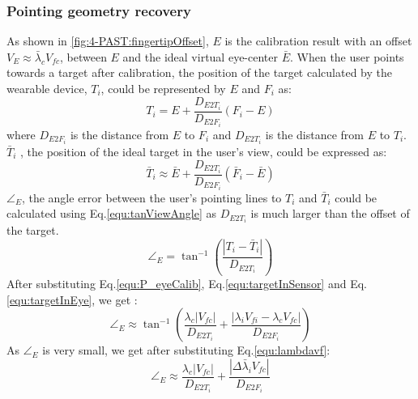 \subsubsection{Pointing geometry recovery} \label{sec:4-PAST:PASTrecovery}
As shown in \figurename{ \ref{fig:4-PAST:fingertipOffset}}, $E$ is the calibration result with an offset $V_{E} \approx \bar\lambda_c V_{fc}$, between $E$ and the ideal virtual eye-center ${\bar E}$. 
When the user points towards a target after calibration, the position of the target calculated by the wearable device, $T_i$, could be represented by $E$ and $F_i$ as:
\begin{equation} \label{equ:targetInSensor}
T_i = E+ \frac{D_{E2T_i}}{D_{E2F_i}}  \left( {F_i - E} \right)
\end{equation}
where $D_{E2F_i}$ is the distance from $E$ to ${{F_i}}$ and $D_{E2T_i}$ is the distance from ${E}$ to ${T_i}$. \\
$\bar T_i$ , the position of the ideal target in the user's view, could be expressed as:
\begin{equation} \label{equ:targetInEye}
\bar T_i \approx {\bar E} + \frac{D_{E2T_i}}{D_{E2F_i}}  \left( {{\bar F_i} - {\bar E}} \right)
\end{equation}
${\angle}_{E}$, the angle error between the user's pointing lines to $T_i$ and $\bar T_i$ could be calculated using Eq.\ref{equ:tanViewAngle} as $D_{E2T_i}$ is much larger than the offset of the target. 
\begin{equation} \label{equ:tanViewAngle}
{\angle}_{E} = \tan^{-1} \left( {\frac{| {T_i - \bar T_i}| }{D_{E2T_i}} } \right)
\end{equation}
After substituting Eq.\ref{equ:P_eyeCalib}, Eq.\ref{equ:targetInSensor} and Eq.\ref{equ:targetInEye}, we get :
\begin{equation} \label{equ:tanViewAngle1}
{\angle}_{E} \approx \tan^{-1} \left( {{\frac{{\lambda_c{|V_{fc}|} }}{D_{E2T_i}} + \frac{{|\lambda_i V_{fi} - \lambda_c V_{fc}|} }{D_{E2F_i}}} } \right)
\end{equation}
As ${\angle}_{E}$ is very small, we get after substituting Eq.\ref{equ:lambdavf}:
\begin{equation} \label{equ:ViewAngleError}
{\angle}_{E} \approx \frac{ {\lambda_c{|V_{fc}|}} }{D_{E2T_i}} + \frac{ {|\Delta \bar \lambda_i V_{fc}|} }{D_{E2F_i}}
\end{equation}
